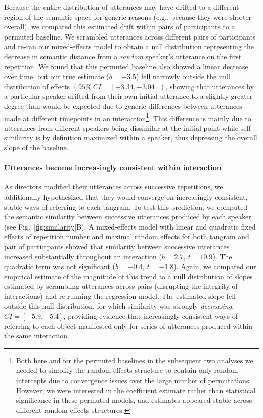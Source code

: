 \documentclass[alpha-refs]{wiley-article}
\begin{document}
Because the entire distribution of utterances may have drifted to a different region of the semantic space for generic reasons (e.g., because they were shorter overall), we compared this estimated drift within pairs of participants to a permuted baseline.
We scrambled utterances across different pairs of participants and re-ran our mixed-effects model to obtain a null distribution representing the decrease in semantic distance from a \emph{random} speaker's utterance on the first repetition.
We found that this permuted baseline also showed a linear decrease over time, but our true estimate ($b=-3.5$) fell narrowly outside the null distribution of effects $(95\%~CI= [-3.34, -3.04])$, showing that utterances by a particular speaker drifted from their own initial utterance to a slightly greater degree than would be expected due to generic differences between utterances made at different timepoints in an interaction\footnote{Both here and for the permuted baselines in the subsequent two analyses we needed to simplify the random effects structure to contain only random intercepts due to convergence issues over the large number of permutations. However, we were interested in the coefficient estimate rather than statistical significance in these permuted models, and estimates appeared stable across different random effects structures.}.
This difference is mainly due to utterances from different speakers being dissimilar at the initial point while self-similarity is by definition maximized within a speaker, thus depressing the overall slope of the baseline.



\paragraph{Utterances become increasingly consistent within interaction} 
As directors modified their utterances across successive repetitions, we additionally hypothesized that they would converge on increasingly consistent, stable ways of referring to each tangram.
To test this prediction, we computed the semantic similarity between successive utterances produced by each speaker (see Fig.~\ref{fig:similarity}B). %
A mixed-effects model with linear and quadratic fixed effects of repetition number and maximal random effects for both tangram and pair of participants showed that similarity between successive utterances increased substantially throughout an interaction ($b = 2.7,~t = 10.9$). 
The quadratic term was not significant ($b= -0.4,~t=-1.8$).
Again, we compared our empirical estimate of the magnitude of this trend to a null distribution of slopes estimated by scrambling utterances across pairs (disrupting the integrity of interactions) and re-running the regression model.%
The estimated slope fell outside this null distribution, for which similarity was strongly \emph{decreasing}, $CI = [-5.9, -5.4]$, providing evidence that increasingly consistent ways of referring to each object manifested only for series of utterances produced within the same interaction.
\end{document}
